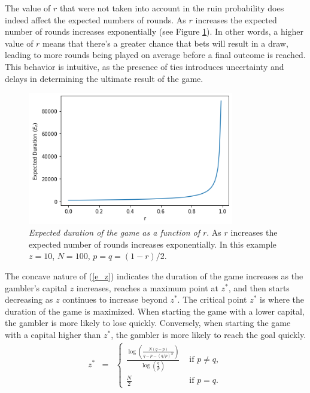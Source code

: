 \documentclass[11pt,twoside]{article}
\numberwithin{Theorem}{section}
\numberwithin{Definition}{section}
\numberwithin{Lemma}{section}
\numberwithin{Algorithm}{section}
\numberwithin{equation}{section}
\begin{document}
The value of $r$ that were not taken into account in the ruin probability does indeed affect the expected numbers of rounds. As $r$ increases the expected number of rounds increases exponentially (see Figure \ref{fig:variation_r}). In other words, a higher value of $r$ means that there's a greater chance that bets will result in a draw, leading to more rounds being played on average before a final outcome is reached. This behavior is intuitive, as the presence of ties introduces uncertainty and delays in determining the ultimate result of the game.

\begin{figure}[h!]
  \centering
    \includegraphics[width=9cm]{r_variation.png}
  \caption[Expected duration of the game as a function of $r$]{\textit{Expected duration of the game as a function of $r$}. As $r$ increases the expected number of rounds increases exponentially. In this example $z = 10$, $N = 100$, $p = q = (1-r)/2$.}  
  \label{fig:variation_r}
\end{figure}

The concave nature of (\ref{e_z}) indicates the duration of the game increases as the gambler's capital $z$ increases, reaches a maximum point at $z^{*}$, and then starts decreasing as $z$ continues to increase beyond $z^{*}$. The critical point $z^{*}$ is where the duration of the game is maximized. When starting the game with a lower capital, the gambler is more likely to lose quickly. Conversely,  when starting the game with a capital higher than $z^{*}$, the gambler is more likely to reach the goal quickly.
 \begin{eqnarray}
z^{*}&=& \left\{
\begin{array}{ll}
\frac{\log\left(\frac{N(q-p)}{q-p - (q/p)^N}\right)}{\log\left(\frac{q}{p}\right)}& \text{ if } p\neq q,\\[15pt]
\frac{N}{2}& \text{ if } p= q. 
\end{array}
\right.
\end{eqnarray}
\end{document}
